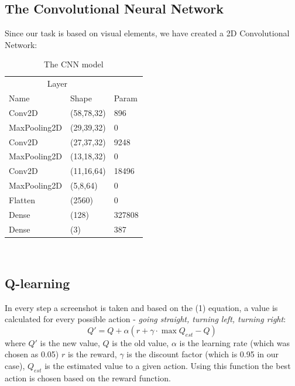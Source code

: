 \documentclass{article}
\begin{document}
\subsection{The Convolutional Neural Network}
Since our task is based on visual elements, we have created a 2D Convolutional Network:
\begin{table}[h]
  
  \label{sample-table}
  \centering
  \begin{tabular}{lll}
    \toprule\toprule
    \multicolumn{2}{c}{Layer} \\
    \cmidrule{1-2}
    Name     & Shape    & Param  \\
    \midrule
    Conv2D & (58,78,32)  &  896    \\
    MaxPooling2D & (29,39,32)  &  0   \\
    Conv2D & (27,37,32)  &  9248    \\
    MaxPooling2D & (13,18,32)  &  0    \\
    Conv2D & (11,16,64)  &  18496    \\
    MaxPooling2D & (5,8,64)  &  0    \\
    Flatten & (2560)  &  0   \\
    Dense & (128)  &  327808    \\
    Dense & (3)  &  387    \\
    \bottomrule
  \end{tabular}\\[5pt]
  \caption{The CNN model}
\end{table}
\subsection{Q-learning}
In every step a screenshot is taken and based on the (1) equation, a value is calculated
for every possible action - \textit{going straight, turning left, turning right}:
\begin{equation}
  Q'=Q+\alpha(r+\gamma\cdot \max Q_{est}-Q)
\end{equation}
where $Q'$ is the new value, $Q$ is the old value, $\alpha$ is the learning rate (which was chosen as 0.05)
$r$ is the reward, $\gamma$ is the discount factor (which is 0.95 in our case), 
$Q_{est}$ is the estimated value to a given action. Using this function the best action
is chosen based on the reward function.
\end{document}
